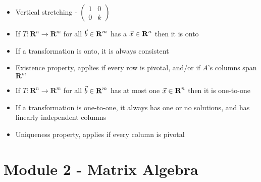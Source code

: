 \documentclass{article}
\begin{document}
\begin{itemize}
    \item Vertical stretching - \(\begin{pmatrix} 1&0 \\ 0&k \end{pmatrix}\)
    \item If \(T:\textbf{R}^n\rightarrow\textbf{R}^m\) for all \(\vec{b}\in \mbox{\textbf{R}}^m\) has a \(\vec{x}\in \mbox{\textbf{R}}^n\) then it is onto 
    \item If a transformation is onto, it is always consistent
    \item Existence property, applies if every row is pivotal, and/or if \(A\)'s columns span \(\textbf{R}^m\)
    \item If \(T:\textbf{R}^n\rightarrow\textbf{R}^m\) for all \(\vec{b}\in \mbox{\textbf{R}}^m\) has at most one \(\vec{x}\in \mbox{\textbf{R}}^n\) then it is one-to-one 
    \item If a transformation is one-to-one, it always has one or no solutions, and has linearly independent columns
    \item Uniqueness property, applies if every column is pivotal
\end{itemize}

\section{Module 2 - Matrix Algebra}
\end{document}
